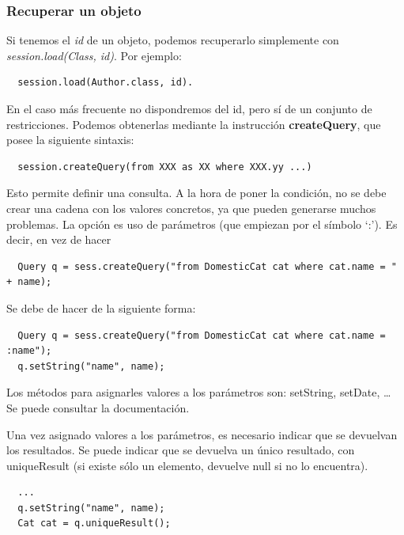 \documentclass[11pt]{article}
\begin{document}
\subsubsection{Recuperar un objeto} \label{sec-6-3-1}

Si tenemos el \emph{id} de un objeto, podemos recuperarlo simplemente con
\emph{session.load(Class, id)}. Por ejemplo:

\begin{lstlisting}
  session.load(Author.class, id).
\end{lstlisting}

En el caso más frecuente no dispondremos del \textsf{id}, pero sí de un conjunto de
restricciones. Podemos obtenerlas mediante la instrucción \textbf{createQuery}, 
que posee la siguiente sintaxis:

\begin{lstlisting}
  session.createQuery(from XXX as XX where XXX.yy ...)
\end{lstlisting}

Esto permite definir una consulta. A la hora de poner la condición, no se debe 
crear una cadena con los valores concretos, ya que pueden generarse muchos
problemas. La opción es uso de parámetros (que empiezan por el símbolo `:'). Es decir, en vez de hacer

\begin{lstlisting}
  Query q = sess.createQuery("from DomesticCat cat where cat.name = " + name);
\end{lstlisting}


Se debe de hacer de la siguiente forma:

\begin{lstlisting}
  Query q = sess.createQuery("from DomesticCat cat where cat.name = :name");
  q.setString("name", name);
\end{lstlisting}


Los métodos para asignarles valores a los parámetros son: \textsf{setString},
\textsf{setDate}, \ldots{} Se puede consultar la documentación.

Una vez asignado valores a los parámetros, es necesario indicar que se devuelvan
los resultados. Se puede indicar que se devuelva un único resultado, con
uniqueResult (si existe sólo un elemento, devuelve null si no lo encuentra).

\begin{lstlisting}
  ...
  q.setString("name", name);
  Cat cat = q.uniqueResult();
\end{lstlisting}
\end{document}
